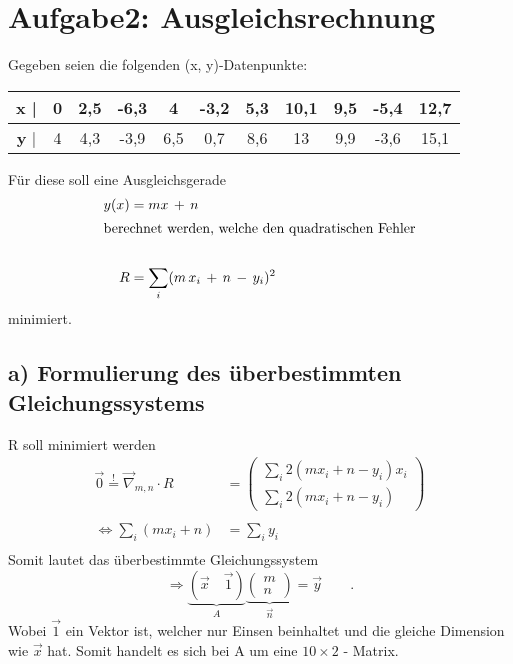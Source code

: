 \section*{Aufgabe2: Ausgleichsrechnung}

Gegeben seien die folgenden (x, y)-Datenpunkte:
\FloatBarrier
\begin{table}[h]
    \centering
    \begin{tabular}{S S S S S S S S S S S}
      \toprule
        \textbf{x} | & 0 & 2,5 & -6,3 & 4 & -3,2 & 5,3 & 10,1 & 9,5 & -5,4 & 12,7 \\
      \midrule
        \textbf{y} | & 4 & 4,3 & -3,9 & 6,5 & 0,7 & 8,6 & 13 & 9,9 & -3,6 & 15,1 \\
        \bottomrule
    \end{tabular}
\end{table}
\noindent
Für diese soll eine Ausgleichsgerade
\begin{align*}
  y(x)&=mx\,+\,n \\
\intertext{berechnet werden, welche den quadratischen Fehler}\\
  R& = \sum_i(m\, x_i \, +\, n \, -\, y_i)^2\\
\end{align*}
minimiert.




\subsection*{a) Formulierung des überbestimmten Gleichungssystems}

R soll minimiert werden
\begin{align*}
  \vec{0} \stackrel{!}{=}\vec{\nabla}_{m,n}\cdot R &=\left(\begin{array}{c} \sum_i 2(mx_i+n-y_i)x_i \\ \sum_i 2(mx_i+n-y_i) \end{array}\right)\\ \\
  \Leftrightarrow \sum_i(m x_i + n) & = \sum_i y_i \\
\end{align*}
Somit lautet das überbestimmte Gleichungssystem
\begin{equation*}
  \Rightarrow \underbrace{\left(\vec{x} \quad  \vec{1} \right)}_{A}\underbrace{\left(\begin{array}{c} m \\ n \end{array}\right)}_{\vec{n}} = \vec{y} \qquad .
\end{equation*}
\noindent
Wobei $\vec{1}$ ein Vektor ist, welcher nur Einsen beinhaltet und die gleiche Dimension wie $\vec{x}$ hat. Somit handelt es sich bei A um eine $10\times 2$ - Matrix.

